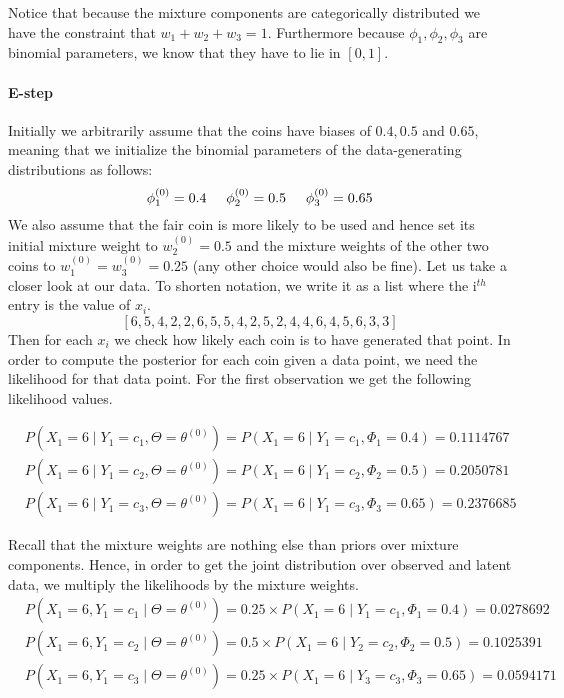 \documentclass[11pt,leqno,a4paper]{report}\usepackage[]{graphicx}\usepackage[]{color}
\begin{document}
Notice that because the mixture components are categorically distributed we have the constraint that
$ w_{1} + w_{2} + w_{3} = 1 $. Furthermore because $ \phi_{1}, \phi_{2}, \phi_{3} $ are binomial parameters, we know that they have to lie in $ [0,1] $.

\paragraph{E-step} Initially we arbitrarily assume that the coins have biases of $ 0.4, 0.5  $ and $ 0.65 $, meaning that we initialize the binomial parameters of the data-generating
distributions as follows:
\begin{equation}
\phi^{(0)}_{1} = 0.4 \hskip 0.5cm  \phi^{(0)}_{2} = 0.5 \hskip 0.5cm  \phi^{(0)}_{3} = 0.65
\end{equation}
We also assume that the fair coin is more likely to be used and hence set its initial mixture weight to $ w_2^{(0)}=0.5 $ and the mixture weights of the 
other two coins to $ w_1^{(0)}=w_3^{(0)}=0.25 $ (any other choice would also be fine). Let 
us take a closer look at our data. To shorten notation, we write it as a list where the i$ ^{th} $ entry is the value of $ x_{i} $.
$$ \left[ 6, 5, 4, 2, 2, 6, 5, 5, 4, 2, 5, 2, 4, 4, 6, 4, 5, 6, 3, 3 \right] $$ 
Then for each $ x_{i} $ we check how likely each coin is to have generated that point. In order to compute the posterior for each coin given a data point, we need
the likelihood for that data point. For the first observation we get the following likelihood values.


\begin{align}
&P(X_{1}=6 \mid Y_{1} = c_{1}, \Theta=\theta^{(0)}) = P(X_{1}=6 \mid Y_{1}=c_{1},\Phi_{1} = 0.4) = 0.1114767& \\
&P(X_{1}=6 \mid Y_{1} = c_{2}, \Theta=\theta^{(0)}) = P(X_{1}=6 \mid Y_{1}=c_{2},\Phi_{2} = 0.5) = 0.2050781& \nonumber \\ 
&P(X_{1}=6 \mid Y_{1} = c_{3}, \Theta=\theta^{(0)}) = P(X_{1}=6 \mid Y_{1}=c_{3},\Phi_{3} = 0.65) = 0.2376685& \nonumber
\end{align}

Recall that the mixture weights are nothing else than priors over mixture components. Hence, in order to get the joint distribution over observed and
latent data, we multiply the likelihoods by the mixture weights.
\begin{align}
&P(X_{1}=6,Y_{1} = c_{1}\mid \Theta=\theta^{(0)}) = 0.25 \times P(X_{1}=6 \mid Y_{1}=c_{1},\Phi_{1} = 0.4) = 0.0278692 \\
&P(X_{1}=6,Y_{1} = c_{2}\mid \Theta=\theta^{(0)}) = 0.5 \times P(X_{1}=6 \mid Y_{2}=c_{2},\Phi_{2} = 0.5) = 0.1025391 \nonumber \\ 
&P(X_{1}=6,Y_{1} = c_{3}\mid \Theta=\theta^{(0)}) = 0.25 \times P(X_{1}=6 \mid Y_{3}=c_{3},\Phi_{3} = 0.65) = 0.0594171 \nonumber
\end{align}
\end{document}
